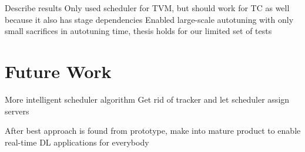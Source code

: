 Describe results
Only used scheduler for TVM, but should work for TC as well because it also has stage dependencies
Enabled large-scale autotuning with only small sacrifices in autotuning time, thesis holds for our limited set of tests

\section{Future Work}
More intelligent scheduler algorithm
Get rid of tracker and let scheduler assign servers

After best approach is found from prototype, make into mature product to enable real-time DL applications for everybody